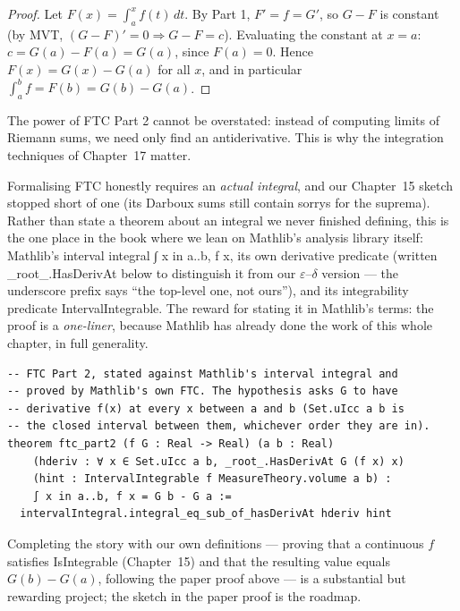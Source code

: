 \documentclass[12pt, openany]{book}
\theoremstyle{plain}
\theoremstyle{definition}
\theoremstyle{remark}
\newcommand{\li}[1]{{\ttfamily\small\color{tealaccent}#1}}
\begin{document}
\begin{proof}
Let $F(x) = \int_a^x f(t)\,dt$. By Part 1, $F' = f = G'$, so $G - F$ is constant (by MVT, $(G-F)'=0 \Rightarrow G-F=c$). Evaluating the constant at $x = a$: $c = G(a) - F(a) = G(a)$, since $F(a) = 0$. Hence $F(x) = G(x) - G(a)$ for all $x$, and in particular $\int_a^b f = F(b) = G(b) - G(a)$.
\end{proof}

The power of FTC Part 2 cannot be overstated: instead of computing limits of Riemann sums, we need only find an antiderivative. This is why the integration techniques of Chapter~17 matter.

Formalising FTC honestly requires an \emph{actual integral}, and our Chapter~15 sketch stopped short of one (its Darboux sums still contain \li{sorry}s for the suprema).  Rather than state a theorem about an integral we never finished defining, this is the one place in the book where we lean on Mathlib's analysis library itself: Mathlib's interval integral \li{∫ x in a..b, f x}, its own derivative predicate (written \li{\_root\_.HasDerivAt} below to distinguish it from our $\varepsilon$--$\delta$ version --- the underscore prefix says ``the top-level one, not ours''), and its integrability predicate \li{IntervalIntegrable}.  The reward for stating it in Mathlib's terms: the proof is a \emph{one-liner}, because Mathlib has already done the work of this whole chapter, in full generality.

\begin{leanbox}
\begin{lstlisting}
-- FTC Part 2, stated against Mathlib's interval integral and
-- proved by Mathlib's own FTC. The hypothesis asks G to have
-- derivative f(x) at every x between a and b (Set.uIcc a b is
-- the closed interval between them, whichever order they are in).
theorem ftc_part2 (f G : Real -> Real) (a b : Real)
    (hderiv : ∀ x ∈ Set.uIcc a b, _root_.HasDerivAt G (f x) x)
    (hint : IntervalIntegrable f MeasureTheory.volume a b) :
    ∫ x in a..b, f x = G b - G a :=
  intervalIntegral.integral_eq_sub_of_hasDerivAt hderiv hint
\end{lstlisting}
\end{leanbox}
\color{black}

Completing the story with our own definitions --- proving that a continuous $f$ satisfies \li{IsIntegrable} (Chapter~15) and that the resulting value equals $G(b) - G(a)$, following the paper proof above --- is a substantial but rewarding project; the sketch in the paper proof is the roadmap.
\end{document}
